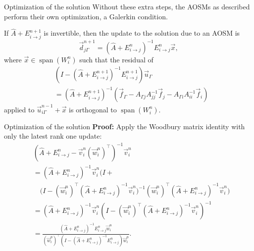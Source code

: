\documentclass{beamer}
\newcommand{\vecw}{\left ( \vec{w}_i^n \right )^\top}
\newcommand{\Aij}{\left ( \hat{A} + E_{i \to j}^{n} \right )^{-1}}
\newcommand{\AijE}{\Aij E_{i \to j}^{n}}
\DeclareMathOperator{\Span}{span}
\begin{document}
\begin{frame}{Optimization of the solution}
Without these extra steps, the AOSMs as described perform their own optimization, a Galerkin condition.

\begin{theorem} \label{thm: opt}
If $\hat{A} + E_{i \to j}^{n+1}$ is invertible, then the update to the solution due to an AOSM is $$\vec{d}_{j \Gamma}^{n+1} = \AijE \vec{x},$$ where
$\vec{x} \in  \Span(W_i^n)$ such that the residual of
\begin{align*}
	& \left ( I - \left ( \hat{A} + E_{i \to j}^{n+1} \right )^{-1} E_{i \to j}^{n+1} \right ) \vec{u}_\Gamma \\
	& = \left ( \hat{A} + E_{i \to j}^{n+1} \right )^{-1} \left ( \vec{f}_\Gamma - A_{\Gamma j} A_{jj}^{-1} \vec{f}_j - A_{\Gamma i} A_{ii}^{-1} \vec{f}_i \right )
\end{align*}
applied to $\vec{u}_{i \Gamma}^{n-1} + \vec{x}$ is orthogonal to $\Span(W_i^n)$. 
\end{theorem}
\end{frame}

\begin{frame}{Optimization of the solution}
\textbf{Proof:}
Apply the Woodbury matrix identity with only the latest rank one update:
\begin{align*}
	& \left ( \hat{A} + E_{i \to j}^n - \vec{v}_i^n \vecw \right )^{-1} \vec{v}_i^n \\
	& = \left ( \hat{A} + E_{i \to j}^n \right )^{-1} \vec{v}_i^n \Bigg ( I + \\
	& \quad \bigg (I - \vecw \left ( \hat{A} + E_{i \to j}^n \right )^{-1} \vec{v}_i^n \bigg )^{-1} \vecw \left ( \hat{A} + E_{i \to j}^n \right )^{-1} \vec{v}_i^n \Bigg ) \\
	& = \left ( \hat{A} + E_{i \to j}^n \right )^{-1} \vec{v}_i^n \left ( I - \vecw \left ( \hat{A} + E_{i \to j}^n \right )^{-1} \vec{v}_i^n \right )^{-1} \\
	& = \frac{\AijE \vec{w}_i^n}{\vecw \left ( I - \AijE \right ) \vec{w}_i^n}.
\end{align*}
\end{frame}
\end{document}
